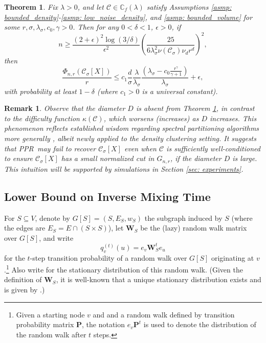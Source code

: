 \documentclass{article}
\newcommand{\vol}{\mathrm{vol}}
\newcommand{\1}{\mathbf{1}}
\newcommand{\Xbf}{X}             %
\newcommand{\Wbf}{\mathbf{W}}
\newcommand{\Cbb}{\mathbb{C}}
\newcommand{\Cset}{\mathcal{C}}
\newcommand{\Csig}{\Cset_{\sigma}}
\newcommand{\pprspace}{{\sc PPR~}}
\theoremstyle{aldenthm}
\newtheorem{theorem}{Theorem}
\theoremstyle{aldenrmrk}
\newtheorem{remark}{Remark}
\begin{document}
\begin{theorem}
	\label{thm: conductance_upper_bound}
	Fix $\lambda > 0$, and let $\Cset \in \Cbb_f(\lambda)$ satisfy
	Assumptions \ref{asmp: bounded_density}-\ref{asmp: low_noise_density}, and \ref{asmp: bounded_volume} for some 
	$r, \sigma, \lambda_{\sigma}, c_0, \gamma > 0$. 
	Then for any $0 < \delta < 1$, $\epsilon > 0$, if
	\begin{equation}
	\label{eqn: conductance_sample_complexity}
	n \geq \frac{(2+\epsilon)^2\log(3/\delta)}{\epsilon^2}\left(\frac{25}
	{6 \lambda_{\sigma}^2\nu(\Csig) \nu_d r^d}\right)^2,
	\end{equation}
	then
	\begin{equation}
	\label{eqn: conductance_additive_error_bound}
	\frac{\Phi_{n,r}(\Csig[\Xbf])}{r} \leq c_1 \frac{d}{\sigma}
	\frac{\lambda}{\lambda_{\sigma}} \frac{(\lambda_{\sigma} -
		c_0\frac{r^{\gamma}}{\gamma+1})}{\lambda_{\sigma}} + \epsilon, 
	\end{equation}
	with probability at least $1-\delta$ (where $c_1 > 0$ is a universal constant).
\end{theorem}

\begin{remark}
	Observe that the diameter $D$ is absent from Theorem \ref{thm: conductance_upper_bound}, in contrast to the difficulty function $\kappa(\Cset)$, which worsens (increases) as $D$ increases. This phenomenon reflects established wisdom regarding spectral partitioning algorithms more generally \cite{guattery1995, hein2010}, albeit newly applied to the density clustering setting. It suggests that \pprspace may fail to recover $\Csig[\Xbf]$ even when $\Cset$ is sufficiently well-conditioned to ensure $\Csig[\Xbf]$ has a small normalized cut in $G_{n,r}$, if the diameter $D$ is large. This intuition will be supported by simulations in Section \ref{sec: experiments}.
\end{remark}

\subsection{Lower Bound on Inverse Mixing Time}
For $S \subseteq V$, denote by $G[S] = (S, E_S, w_S)$ the subgraph induced by 
$S$ (where the edges are $E_S = E \cap (S \times S)$), let $\Wbf_S$ be the (lazy) random walk matrix over $G[S]$, and write 
$$
q_{v}^{(t)}(u) = e_v\Wbf_S^t e_u
$$
for the $t$-step transition probability of a random walk over $G[S]$
originating at $v$.\footnote{Given a starting node $v$ and and a random walk
	defined by transition probability matrix $\mathbf{P}$, the notation $e_v
	\mathbf{P}^t$ is used to denote the distribution of the random walk after $t$
	steps.}   Also write 
for the stationary distribution of this random walk.  (Given the definition of 
$\Wbf_S$, it is well-known that a unique stationary distribution exists and is given by
\smash{$\pi(u) = \deg(u; G[S])/\vol(S; G[S])$}.) 
\end{document}
